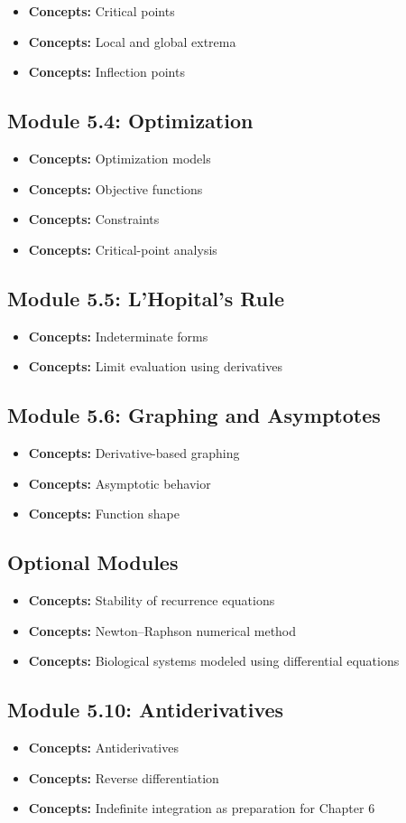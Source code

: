 \documentclass[11pt]{article}
\newcommand{\concept}[1]{\item \textbf{Concepts:} #1}
\begin{document}
\begin{itemize}
    \concept{Critical points}
    \concept{Local and global extrema}
    \concept{Inflection points}
\end{itemize}

\subsection{Module 5.4: Optimization}

\begin{itemize}
    \concept{Optimization models}
    \concept{Objective functions}
    \concept{Constraints}
    \concept{Critical-point analysis}
\end{itemize}

\subsection{Module 5.5: L'Hopital's Rule}

\begin{itemize}
    \concept{Indeterminate forms}
    \concept{Limit evaluation using derivatives}
\end{itemize}

\subsection{Module 5.6: Graphing and Asymptotes}

\begin{itemize}
    \concept{Derivative-based graphing}
    \concept{Asymptotic behavior}
    \concept{Function shape}
\end{itemize}

\subsection{Optional Modules}

\begin{itemize}
    \concept{Stability of recurrence equations}
    \concept{Newton--Raphson numerical method}
    \concept{Biological systems modeled using differential equations}
\end{itemize}

\subsection{Module 5.10: Antiderivatives}

\begin{itemize}
    \concept{Antiderivatives}
    \concept{Reverse differentiation}
    \concept{Indefinite integration as preparation for Chapter 6}
\end{itemize}
\end{document}
